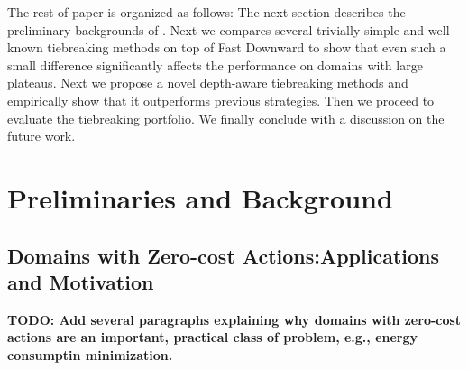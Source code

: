 The rest of paper is organized as follows: The next section describes the
preliminary backgrounds of \astar.
Next we compares several trivially-simple and well-known tiebreaking
methods on top of Fast Downward to show that even such a small
difference significantly affects the performance on domains with
large plateaus.
Next we propose a novel depth-aware tiebreaking methods and empirically
show that it outperforms previous strategies.
Then we proceed to evaluate the tiebreaking portfolio.
We finally conclude with a discussion on the future work.

\section{Preliminaries and Background}

\subsection{Domains with Zero-cost Actions:Applications and Motivation}
{\bf TODO: Add several paragraphs explaining why domains with zero-cost actions are an important, practical class of problem, e.g., energy consumptin minimization.  }





